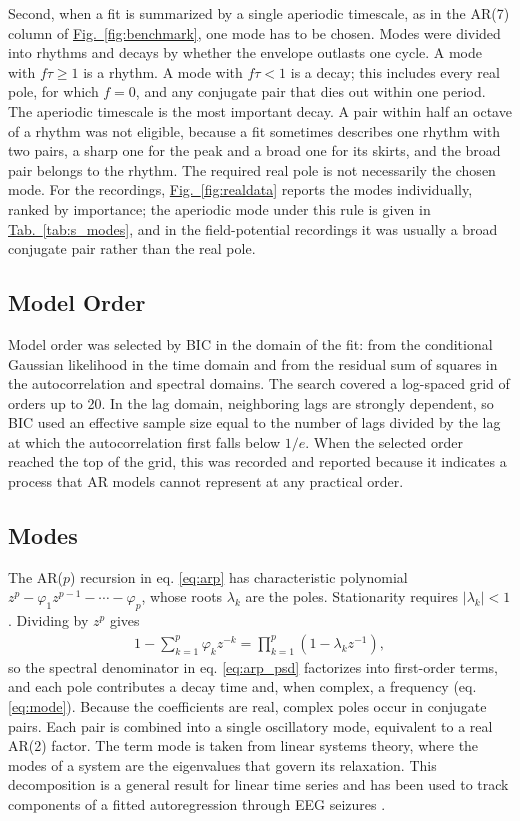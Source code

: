 \documentclass[pdflatex,lineno,sn-nature]{sn-jnl}
\newcommand{\figpanel}[3][]{\hyperref[#2]{Fig.~#1\ref*{#2}#3}}
\newcommand{\tabpanel}[2][]{\hyperref[#2]{Tab.~#1\ref*{#2}}}
\theoremstyle{thmstyleone}
\theoremstyle{thmstyletwo}
\theoremstyle{thmstylethree}
\begin{document}
Second, when a fit is summarized by a single aperiodic timescale, as in the AR(7) column of \figpanel{fig:benchmark}{}, one mode has to be chosen. Modes were divided into rhythms and decays by whether the envelope outlasts one cycle. A mode with $f\tau \geq 1$ is a rhythm. A mode with $f\tau < 1$ is a decay; this includes every real pole, for which $f = 0$, and any conjugate pair that dies out within one period. The aperiodic timescale is the most important decay. A pair within half an octave of a rhythm was not eligible, because a fit sometimes describes one rhythm with two pairs, a sharp one for the peak and a broad one for its skirts, and the broad pair belongs to the rhythm. The required real pole is not necessarily the chosen mode. For the recordings, \figpanel{fig:realdata}{} reports the modes individually, ranked by importance; the aperiodic mode under this rule is given in \tabpanel{tab:s_modes}, and in the field-potential recordings it was usually a broad conjugate pair rather than the real pole.

\subsection{Model Order}

Model order was selected by BIC \cite{schwarz_estimating_1978} in the domain of the fit: from the conditional Gaussian likelihood in the time domain and from the residual sum of squares in the autocorrelation and spectral domains. The search covered a log-spaced grid of orders up to 20. In the lag domain, neighboring lags are strongly dependent, so BIC used an effective sample size equal to the number of lags divided by the lag at which the autocorrelation first falls below $1/e$. When the selected order reached the top of the grid, this was recorded and reported because it indicates a process that AR models cannot represent at any practical order.

\subsection{Modes}

The AR($p$) recursion in eq. \ref{eq:arp} has characteristic polynomial $z^p - \varphi_1 z^{p-1} - \cdots - \varphi_p$, whose roots $\lambda_k$ are the poles. Stationarity requires $|\lambda_k| < 1$. Dividing by $z^p$ gives
\begin{align}
1 - \sum_{k=1}^{p} \varphi_k z^{-k} = \prod_{k=1}^{p} (1 - \lambda_k z^{-1}), \label{eq:factor}
\end{align}
so the spectral denominator in eq. \ref{eq:arp_psd} factorizes into first-order terms, and each pole contributes a decay time and, when complex, a frequency (eq. \ref{eq:mode}). Because the coefficients are real, complex poles occur in conjugate pairs. Each pair is combined into a single oscillatory mode, equivalent to a real AR(2) factor. The term mode is taken from linear systems theory, where the modes of a system are the eigenvalues that govern its relaxation. This decomposition is a general result for linear time series \cite{west_time_1997} and has been used to track components of a fitted autoregression through EEG seizures \cite{west_evaluation_1999}.
\end{document}
